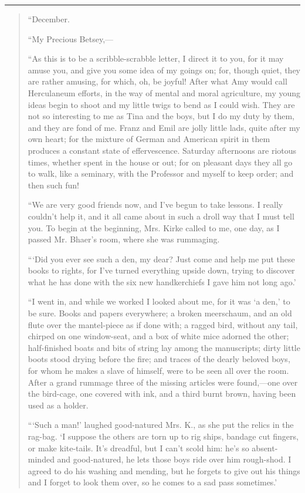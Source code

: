 \begin{center}\rule{0.5\linewidth}{0.5pt}\end{center}

\begin{quote}
``December.

``My Precious Betsey,---

``As this is to be a scribble-scrabble letter, I direct it to you, for it
may amuse you, and give you some idea of my goings on; for, though
quiet, they are rather amusing, for which, oh, be joyful! After what Amy
would call Herculaneum efforts, in the way of mental and moral
agriculture, my young ideas begin to shoot and my little twigs to bend
as I could wish. They are not so interesting to me as Tina and the boys,
but I do my duty by them, and they are fond of me. Franz and Emil are
jolly little lads, quite after my own heart; for the mixture of German
and American spirit in them produces a constant state of effervescence.
Saturday afternoons are riotous times, whether spent in the house or
out; for on pleasant days they all go to walk, like a seminary, with the
Professor and myself to keep order; and then such fun!

``We are very good friends now, and I've begun to take
lessons. I really couldn't help it, and it all came
about in such a droll way that I must tell you. To begin at the
beginning, Mrs. Kirke called to me, one day, as I passed Mr.
Bhaer's room, where she was rummaging.

```Did you ever see such a den, my dear? Just come and
help me put these books to rights, for I've turned
everything upside down, trying to discover what he has done with the six
new handkerchiefs I gave him not long ago.'

``I went in, and while we worked I looked about me, for it was
`a den,' to be sure. Books and papers
everywhere; a broken meerschaum, and an old flute over the mantel-piece
as if done with; a ragged bird, without any tail, chirped on one
window-seat, and a box of white mice adorned the other; half-finished
boats and bits of string lay among the manuscripts; dirty little boots
stood drying before the fire; and traces of the dearly beloved boys, for
whom he makes a slave of himself, were to be seen all over the room.
After a grand rummage three of the missing articles were found,---one
over the bird-cage, one covered with ink, and a third burnt brown,
having been used as a holder.

```Such a man!' laughed good-natured
Mrs. K., as she put the relics in the rag-bag. `I
suppose the others are torn up to rig ships, bandage cut fingers, or
make kite-tails. It's dreadful, but I
can't scold him: he's so absent-minded
and good-natured, he lets those boys ride over him rough-shod. I agreed
to do his washing and mending, but he forgets to give out his things and
I forget to look them over, so he comes to a sad pass
sometimes.'


\end{quote}
